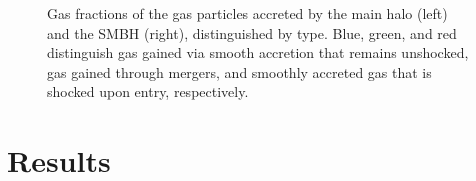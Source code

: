 \documentclass[]{emulateapj}
\begin{document}
\begin{figure}
\centerline{}
\caption[]{Gas fractions of the gas particles accreted by the main halo (left) and the SMBH (right), distinguished by type. Blue, green, and red distinguish gas gained via smooth accretion that remains unshocked, gas gained through mergers, and smoothly accreted gas that is shocked upon entry, respectively.}
\label{hrh258stackfrac}
\end{figure}


\section{Results} \label{results}

\end{document}
